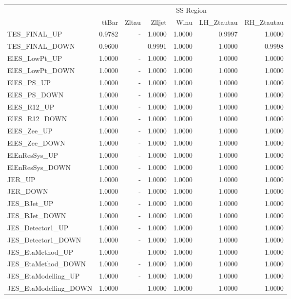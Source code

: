 \documentclass[11pt,oneside,a4paper]{article}
\begin{document}
\begin{table}
\centering
\begin{tabular}{lrrrrrr}
 & \multicolumn{6}{c}{SS Region} \\
 & ttBar & Zltau & Zlljet & Wlnu & LH\_Ztautau & RH\_Ztautau \\
TES\_FINAL\_UP & 0.9782 & - & 1.0000 & 1.0000 & 0.9997 & 1.0000 \\
TES\_FINAL\_DOWN & 0.9600 & - & 0.9991 & 1.0000 & 1.0000 & 0.9998 \\
ElES\_LowPt\_UP & 1.0000 & - & 1.0000 & 1.0000 & 1.0000 & 1.0000 \\
ElES\_LowPt\_DOWN & 1.0000 & - & 1.0000 & 1.0000 & 1.0000 & 1.0000 \\
ElES\_PS\_UP & 1.0000 & - & 1.0000 & 1.0000 & 1.0000 & 1.0000 \\
ElES\_PS\_DOWN & 1.0000 & - & 1.0000 & 1.0000 & 1.0000 & 1.0000 \\
ElES\_R12\_UP & 1.0000 & - & 1.0000 & 1.0000 & 1.0000 & 1.0000 \\
ElES\_R12\_DOWN & 1.0000 & - & 1.0000 & 1.0000 & 1.0000 & 1.0000 \\
ElES\_Zee\_UP & 1.0000 & - & 1.0000 & 1.0000 & 1.0000 & 1.0000 \\
ElES\_Zee\_DOWN & 1.0000 & - & 1.0000 & 1.0000 & 1.0000 & 1.0000 \\
ElEnResSys\_UP & 1.0000 & - & 1.0000 & 1.0000 & 1.0000 & 1.0000 \\
ElEnResSys\_DOWN & 1.0000 & - & 1.0000 & 1.0000 & 1.0000 & 1.0000 \\
JER\_UP & 1.0000 & - & 1.0000 & 1.0000 & 1.0000 & 1.0000 \\
JER\_DOWN & 1.0000 & - & 1.0000 & 1.0000 & 1.0000 & 1.0000 \\
JES\_BJet\_UP & 1.0000 & - & 1.0000 & 1.0000 & 1.0000 & 1.0000 \\
JES\_BJet\_DOWN & 1.0000 & - & 1.0000 & 1.0000 & 1.0000 & 1.0000 \\
JES\_Detector1\_UP & 1.0000 & - & 1.0000 & 1.0000 & 1.0000 & 1.0000 \\
JES\_Detector1\_DOWN & 1.0000 & - & 1.0000 & 1.0000 & 1.0000 & 1.0000 \\
JES\_EtaMethod\_UP & 1.0000 & - & 1.0000 & 1.0000 & 1.0000 & 1.0000 \\
JES\_EtaMethod\_DOWN & 1.0000 & - & 1.0000 & 1.0000 & 1.0000 & 1.0000 \\
JES\_EtaModelling\_UP & 1.0000 & - & 1.0000 & 1.0000 & 1.0000 & 1.0000 \\
JES\_EtaModelling\_DOWN & 1.0000 & - & 1.0000 & 1.0000 & 1.0000 & 1.0000 \\

\end{tabular}
\end{table}
\end{document}

